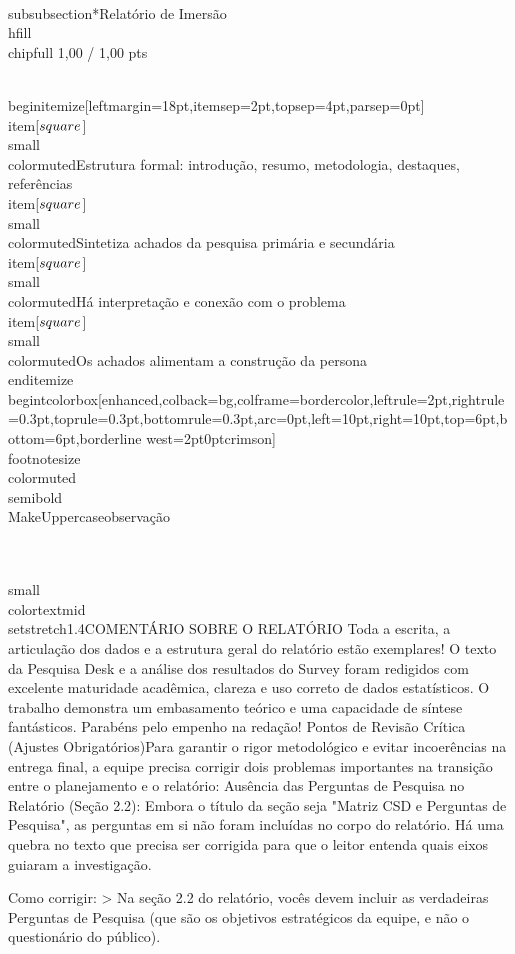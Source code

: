 \documentclass[11pt, a4paper]{article}
\newcommand{\chipfull}[1]{\colorbox{sagedim}{\color{sage}\semibold\small\strut\ #1\ }}
\begin{document}
\\subsubsection*{Relatório de Imersão \\hfill {\\chipfull 1,00 / 1,00 pts}}

\\begin{itemize}[leftmargin=18pt,itemsep=2pt,topsep=4pt,parsep=0pt]
  \\item[$\\square$] {\\small\\color{muted}Estrutura formal: introdução, resumo, metodologia, destaques, referências}
  \\item[$\\square$] {\\small\\color{muted}Sintetiza achados da pesquisa primária e secundária}
  \\item[$\\square$] {\\small\\color{muted}Há interpretação e conexão com o problema}
  \\item[$\\square$] {\\small\\color{muted}Os achados alimentam a construção da persona}
\\end{itemize}
\\begin{tcolorbox}[enhanced,colback=bg,colframe=bordercolor,leftrule=2pt,rightrule=0.3pt,toprule=0.3pt,bottomrule=0.3pt,arc=0pt,left=10pt,right=10pt,top=6pt,bottom=6pt,borderline west={2pt}{0pt}{crimson}]
{\\footnotesize\\color{muted}\\semibold\\MakeUppercase{observação}}\\\\[4pt]
{\\small\\color{textmid}\\setstretch{1.4}COMENTÁRIO SOBRE O RELATÓRIO Toda a escrita, a articulação dos dados e a estrutura geral do relatório estão exemplares! O texto da Pesquisa Desk e a análise dos resultados do Survey foram redigidos com excelente maturidade acadêmica, clareza e uso correto de dados estatísticos. O trabalho demonstra um embasamento teórico e uma capacidade de síntese fantásticos. Parabéns pelo empenho na redação!
Pontos de Revisão Crítica (Ajustes Obrigatórios)Para garantir o rigor metodológico e evitar incoerências na entrega final, a equipe precisa corrigir dois problemas importantes na transição entre o planejamento e o relatório:
Ausência das Perguntas de Pesquisa no Relatório (Seção 2.2): Embora o título da seção seja "Matriz CSD e Perguntas de Pesquisa", as perguntas em si não foram incluídas no corpo do relatório. Há uma quebra no texto que precisa ser corrigida para que o leitor entenda quais eixos guiaram a investigação.

Como corrigir: \textgreater{} Na seção 2.2 do relatório, vocês devem incluir as verdadeiras Perguntas de Pesquisa (que são os objetivos estratégicos da equipe, e não o questionário do público).}
\end{document}
